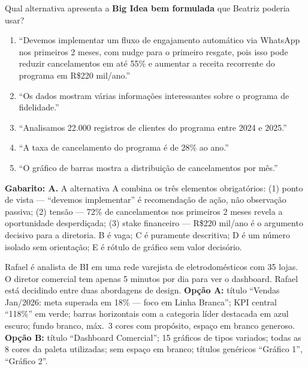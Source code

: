 \begin{SolvedBox}[title=Questão 1 --- Prova II Unidade (2{,}0 pts) --- Big Idea]
Qual alternativa apresenta a \textbf{Big Idea bem formulada} que Beatriz poderia usar?
\begin{enumerate}[label=\Alph*)]
  \item ``Devemos implementar um fluxo de engajamento automático via WhatsApp nos primeiros 2 meses, com nudge para o primeiro resgate, pois isso pode reduzir cancelamentos em até 55\% e aumentar a receita recorrente do programa em R\$220 mil/ano.''
  \item ``Os dados mostram várias informações interessantes sobre o programa de fidelidade.''
  \item ``Analisamos 22.000 registros de clientes do programa entre 2024 e 2025.''
  \item ``A taxa de cancelamento do programa é de 28\% ao ano.''
  \item ``O gráfico de barras mostra a distribuição de cancelamentos por mês.''
\end{enumerate}
\end{SolvedBox}

\textbf{Gabarito: A.} A alternativa A combina os três elementos obrigatórios: (1) ponto de vista --- ``devemos implementar'' é recomendação de ação, não observação passiva; (2) tensão --- 72\% de cancelamentos nos primeiros 2 meses revela a oportunidade desperdiçada; (3) stake financeiro --- R\$220 mil/ano é o argumento decisivo para a diretoria. B é vaga; C é puramente descritiva; D é um número isolado sem orientação; E é rótulo de gráfico sem valor decisório.

\medskip

Rafael é analista de BI em uma rede varejista de eletrodomésticos com 35 lojas. O diretor comercial tem apenas 5 minutos por dia para ver o dashboard. Rafael está decidindo entre duas abordagens de design. \textbf{Opção A:} título ``Vendas Jan/2026: meta superada em 18\% --- foco em Linha Branca''; KPI central ``118\%'' em verde; barras horizontais com a categoria líder destacada em azul escuro; fundo branco, máx.\ 3 cores com propósito, espaço em branco generoso. \textbf{Opção B:} título ``Dashboard Comercial''; 15 gráficos de tipos variados; todas as 8 cores da paleta utilizadas; sem espaço em branco; títulos genéricos ``Gráfico 1'', ``Gráfico 2''.

